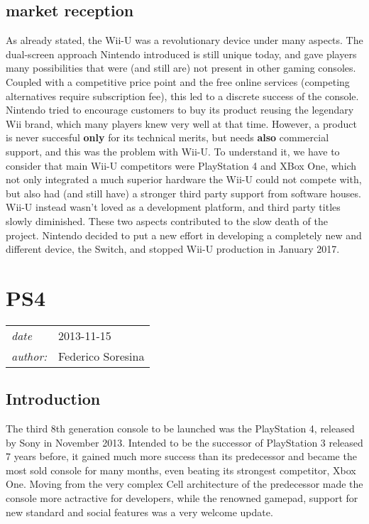 \documentclass[a4paper,10pt]{book}
\newcommand{\pageHeader}[4]{
    \section{#1}
    \vspace{-0.3cm}
    \begin{table}[h!]
     \begin{tabular}{ll}
        \hline
        \textit{date} & #2 \\
        \textit{author: } & #3\\
        \hline
     \end{tabular}
    \end{table}
    \vspace{-0.3cm}
}
\begin{document}
 \subsection{ market reception  }
  As already stated, the Wii-U was a revolutionary device under many aspects. The dual-screen approach Nintendo introduced is still unique today, and gave players many possibilities that were (and still are) not present in other gaming consoles. Coupled with a competitive price point and the free online services (competing alternatives require subscription fee), this led to a discrete success of the console. Nintendo tried to encourage customers to buy its product reusing the legendary Wii brand, which many players knew very well at that time.  
  However, a product is never succesful  \textbf{ only  }  for its technical merits, but needs  \textbf{ also  }  commercial support, and this was the problem with Wii-U. To understand it, we have to consider that main Wii-U competitors were PlayStation 4 and XBox One, which not only integrated a much superior hardware the Wii-U could not compete with, but also had (and still have) a stronger third party support from software houses. Wii-U instead wasn't loved as a development platform, and third party titles slowly diminished. These two aspects contributed to the slow death of the project. Nintendo decided to put a new effort in developing a completely new and different device, the Switch, and stopped Wii-U production in January 2017.  
 \newpage\pageHeader{PS4}{2013-11-15}{Federico Soresina}{PlayStation 4 description page}
 \subsection{ Introduction  }
  The third 8th generation console to be launched was the PlayStation 4, released by Sony in November 2013. Intended to be the successor of PlayStation 3 released 7 years before, it gained much more success than its predecessor and became the most sold console for many months, even beating its strongest competitor, Xbox One. Moving from the very complex Cell architecture of the predecessor made the console more actractive for developers, while the renowned gamepad, support for new standard and social features was a very welcome update.  
\end{document}
